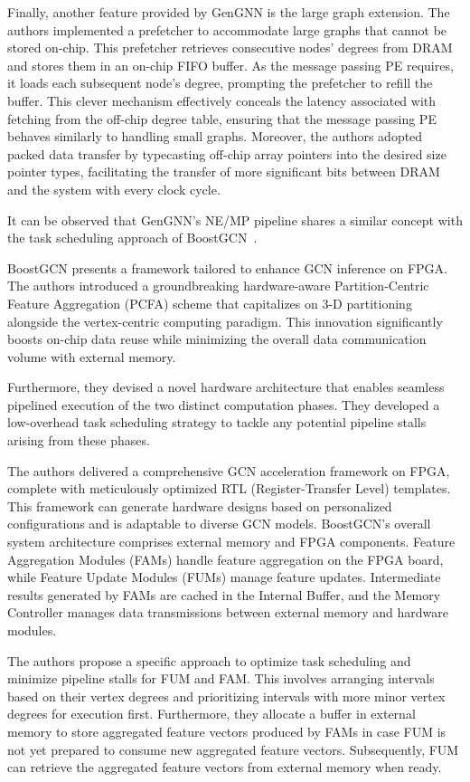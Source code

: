 Finally, another feature provided by GenGNN is the large graph extension.
The authors implemented a prefetcher to accommodate large graphs that cannot be stored on-chip.
This prefetcher retrieves consecutive nodes' degrees from DRAM and stores them in an on-chip FIFO buffer.
As the message passing PE requires, it loads each subsequent node's degree, prompting the prefetcher to refill the buffer.
This clever mechanism effectively conceals the latency associated with fetching from the off-chip degree table, ensuring that the message passing PE behaves similarly to handling small graphs.
Moreover, the authors adopted packed data transfer by typecasting off-chip array pointers into the desired size pointer types, facilitating the transfer of more significant bits between DRAM and the system with every clock cycle.

It can be observed that GenGNN's NE/MP pipeline shares a similar concept with the task scheduling approach of BoostGCN~\cite{9444065}.

BoostGCN presents a framework tailored to enhance GCN inference on FPGA. The authors introduced a groundbreaking hardware-aware Partition-Centric Feature Aggregation (PCFA) scheme that capitalizes on 3-D partitioning alongside the vertex-centric computing paradigm.
This innovation significantly boosts on-chip data reuse while minimizing the overall data communication volume with external memory.

Furthermore, they devised a novel hardware architecture that enables seamless pipelined execution of the two distinct computation phases.
They developed a low-overhead task scheduling strategy to tackle any potential pipeline stalls arising from these phases.

The authors delivered a comprehensive GCN acceleration framework on FPGA, complete with meticulously optimized RTL (Register-Transfer Level) templates.
This framework can generate hardware designs based on personalized configurations and is adaptable to diverse GCN models.
BoostGCN's overall system architecture comprises external memory and FPGA components.
Feature Aggregation Modules (FAMs) handle feature aggregation on the FPGA board, while Feature Update Modules (FUMs) manage feature updates.
Intermediate results generated by FAMs are cached in the Internal Buffer, and the Memory Controller manages data transmissions between external memory and hardware modules.

The authors propose a specific approach to optimize task scheduling and minimize pipeline stalls for FUM and FAM. This involves arranging intervals based on their vertex degrees and prioritizing intervals with more minor vertex degrees for execution first.
Furthermore, they allocate a buffer in external memory to store aggregated feature vectors produced by FAMs in case FUM is not yet prepared to consume new aggregated feature vectors.
Subsequently, FUM can retrieve the aggregated feature vectors from external memory when ready.

